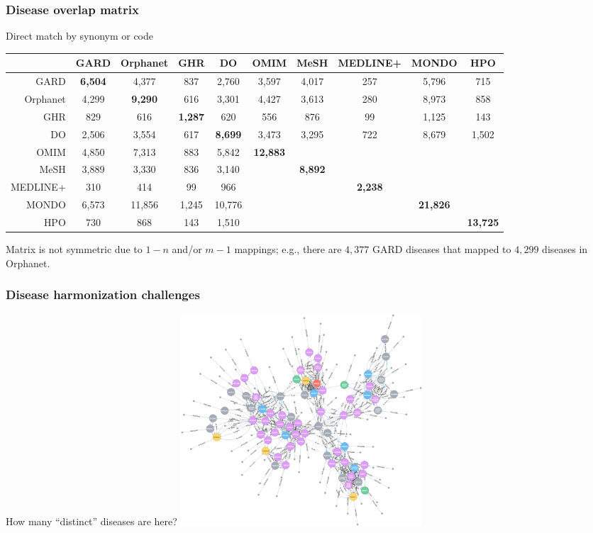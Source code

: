 ﻿\documentclass[anchorcolor=blue,linkcolor=blue]{beamer}
\begin{document}
\begin{frame}
  \frametitle{Disease overlap matrix}
  \begin{block}{Direct match by synonym or code}
    \begin{center}
      \tiny
      \begin{tabular}{rccccccccc}\toprule
        & GARD & Orphanet & GHR & DO & OMIM & MeSH & MEDLINE+&MONDO & HPO\\ \midrule
        GARD & \textbf{6,504}&4,377&837&2,760&3,597&4,017&257&5,796&715\\
        Orphanet &4,299&\textbf{9,290}&616&3,301&4,427&3,613&280&8,973&858\\
        GHR &829&616&\textbf{1,287}&620&556&876&99&1,125&143\\
        DO &2,506&3,554&617&\textbf{8,699}&3,473&3,295&722&8,679&1,502\\
        OMIM &4,850&7,313&883&5,842&\textbf{12,883}&&&&\\
        MeSH &3,889&3,330&836&3,140&&\textbf{8,892}&&&\\
        MEDLINE+ &310&414&99&966&&&\textbf{2,238}&\\
        MONDO &6,573&11,856&1,245&10,776&&&&\textbf{21,826}&\\
        HPO &730&868&143&1,510&&&&&\textbf{13,725}\\ \bottomrule
      \end{tabular}
    \end{center}
    Matrix is not symmetric due to $1-n$ and/or $m-1$ mappings; e.g.,
    there are $4,377$ GARD diseases that mapped to $4,299$ diseases in
    Orphanet.
  \end{block}
\end{frame}

\begin{frame}
  \frametitle{Disease harmonization challenges}
  \begin{block}{How many ``distinct'' diseases are here?}
    \includegraphics[width=9cm]{graph1}
  \end{block}
\end{frame}
\end{document}
